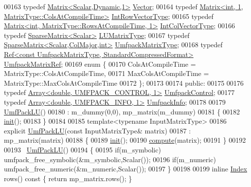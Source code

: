 \begin{DoxyCode}
00163     \textcolor{keyword}{typedef} \hyperlink{group___core___module}{Matrix<Scalar,Dynamic,1>} \hyperlink{group___core___module}{Vector};
00164     \textcolor{keyword}{typedef} \hyperlink{group___core___module}{Matrix<int, 1, MatrixType::ColsAtCompileTime>} 
      \hyperlink{group___core___module}{IntRowVectorType};
00165     \textcolor{keyword}{typedef} \hyperlink{group___core___module}{Matrix<int, MatrixType::RowsAtCompileTime, 1>} 
      \hyperlink{group___core___module}{IntColVectorType};
00166     \textcolor{keyword}{typedef} \hyperlink{group___sparse_core___module}{SparseMatrix<Scalar>} \hyperlink{group___sparse_core___module}{LUMatrixType};
00167     \textcolor{keyword}{typedef} \hyperlink{group___sparse_core___module}{SparseMatrix<Scalar,ColMajor,int>} 
      \hyperlink{group___sparse_core___module}{UmfpackMatrixType};
00168     \textcolor{keyword}{typedef} \hyperlink{group___core___module}{Ref<const UmfpackMatrixType, StandardCompressedFormat>}
       \hyperlink{group___core___module}{UmfpackMatrixRef};
00169     \textcolor{keyword}{enum} \{
00170       ColsAtCompileTime = MatrixType::ColsAtCompileTime,
00171       MaxColsAtCompileTime = MatrixType::MaxColsAtCompileTime
00172     \};
00173 
00174   \textcolor{keyword}{public}:
00175 
00176     \textcolor{keyword}{typedef} \hyperlink{group___core___module}{Array<double, UMFPACK\_CONTROL, 1>} 
      \hyperlink{group___core___module}{UmfpackControl};
00177     \textcolor{keyword}{typedef} \hyperlink{group___core___module}{Array<double, UMFPACK\_INFO, 1>} 
      \hyperlink{group___core___module}{UmfpackInfo};
00178 
00179     \hyperlink{class_eigen_1_1_umf_pack_l_u}{UmfPackLU}()
00180       : m\_dummy(0,0), mp\_matrix(m\_dummy)
00181     \{
00182       \hyperlink{structinit}{init}();
00183     \}
00184 
00185     \textcolor{keyword}{template}<\textcolor{keyword}{typename} InputMatrixType>
00186     \textcolor{keyword}{explicit} \hyperlink{class_eigen_1_1_umf_pack_l_u}{UmfPackLU}(\textcolor{keyword}{const} InputMatrixType& matrix)
00187       : mp\_matrix(matrix)
00188     \{
00189       \hyperlink{structinit}{init}();
00190       \hyperlink{class_eigen_1_1_umf_pack_l_u_a05fb2b5717ebd67e46b83439721ceee7}{compute}(matrix);
00191     \}
00192 
00193     ~\hyperlink{class_eigen_1_1_umf_pack_l_u}{UmfPackLU}()
00194     \{
00195       \textcolor{keywordflow}{if}(m\_symbolic) umfpack\_free\_symbolic(&m\_symbolic,Scalar());
00196       \textcolor{keywordflow}{if}(m\_numeric)  umfpack\_free\_numeric(&m\_numeric,Scalar());
00197     \}
00198 
00199     \textcolor{keyword}{inline} \hyperlink{namespace_eigen_a62e77e0933482dafde8fe197d9a2cfde}{Index} rows()\textcolor{keyword}{ const }\{ \textcolor{keywordflow}{return} mp\_matrix.rows(); \}

\end{DoxyCode}
